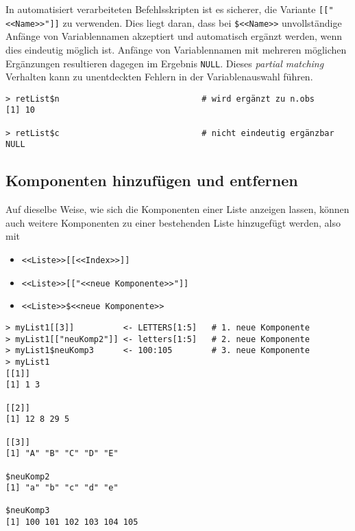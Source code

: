 In automatisiert verarbeiteten Befehlsskripten ist es sicherer, die Variante \lstinline![["<<Name>>"]]! zu verwenden. Dies liegt daran, dass bei \lstinline!$<<Name>>! unvollständige Anfänge von Variablennamen akzeptiert und automatisch ergänzt werden, wenn dies eindeutig möglich ist. Anfänge von Variablennamen mit mehreren möglichen Ergänzungen resultieren dagegen im Ergebnis \lstinline!NULL!. Dieses \emph{partial matching} Verhalten kann zu unentdeckten Fehlern in der Variablenauswahl führen.
\begin{lstlisting}
> retList$n                             # wird ergänzt zu n.obs
[1] 10

> retList$c                             # nicht eindeutig ergänzbar
NULL
\end{lstlisting}

\subsection{Komponenten hinzufügen und entfernen}
\label{sec:addRemove}

Auf dieselbe Weise, wie sich die Komponenten einer Liste anzeigen lassen, können auch weitere Komponenten zu einer bestehenden Liste hinzugefügt werden, also mit
\begin{itemize}
\item \lstinline!<<Liste>>[[<<Index>>]]!
\item \lstinline!<<Liste>>[["<<neue Komponente>>"]]!
\item \lstinline!<<Liste>>$<<neue Komponente>>!
\end{itemize}

\begin{lstlisting}
> myList1[[3]]          <- LETTERS[1:5]   # 1. neue Komponente
> myList1[["neuKomp2"]] <- letters[1:5]   # 2. neue Komponente
> myList1$neuKomp3      <- 100:105        # 3. neue Komponente
> myList1
[[1]]
[1] 1 3

[[2]]
[1] 12 8 29 5

[[3]]
[1] "A" "B" "C" "D" "E"

$neuKomp2
[1] "a" "b" "c" "d" "e"

$neuKomp3
[1] 100 101 102 103 104 105
\end{lstlisting}

